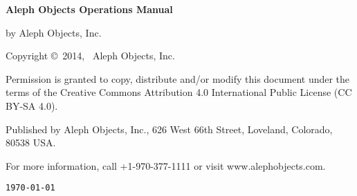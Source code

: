 %
%
%
%
%

\clearpage\null\vfill
\begingroup 
\thispagestyle{empty}
\footnotesize\raggedright
\setlength{\parskip}{0.5\baselineskip}

\textbf{Aleph Objects Operations Manual}

by Aleph Objects, Inc.

Copyright \copyright\ 2014, \the\year\ Aleph Objects, Inc.\par
Permission is granted to copy, distribute and\slash or modify 
this document under the terms of the
Creative Commons Attribution 4.0 International Public License
(CC BY-SA 4.0).

Published by Aleph Objects, Inc., 626 West 66th Street, Loveland, Colorado, 80538 USA.

For more information, call +1-970-377-1111 or visit www.alephobjects.com.

\renewcommand{\dateseparator}{}
\hfill\texttt{\yyyymmdddate\today} %
\endgroup
\pagebreak{}

